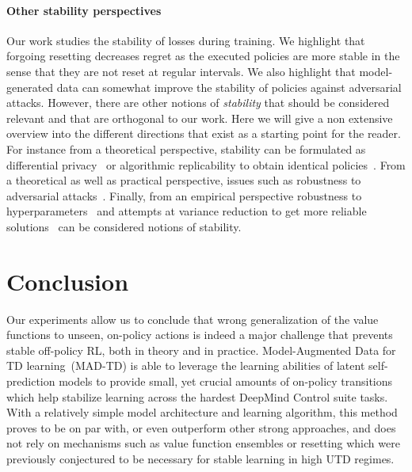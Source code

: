\paragraph{Other stability perspectives} Our work studies the stability of losses during training.
We highlight that forgoing resetting decreases regret as the executed policies are more stable in the sense that they are not reset at regular intervals.
We also highlight that model-generated data can somewhat improve the stability of policies against adversarial attacks.
However, there are other notions of \emph{stability} that should be considered relevant and that are orthogonal to our work. 
Here we will give a non extensive overview into the different directions that exist as a starting point for the reader. For instance from a theoretical perspective, stability can be formulated as differential privacy~\textcite{vietri2020private} or algorithmic replicability to obtain identical policies~\textcite{eaton2023replicable}. From a theoretical as well as practical perspective, issues such as robustness to adversarial attacks~\textcite{nilim2005robust, iyengar2005robust, wiesemann2013robust, pinto2017robust}. Finally, from an empirical perspective robustness to hyperparameters~\textcite{ceron2024consistency, patterson2024cross} and attempts at variance reduction to get more reliable solutions~\textcite{anschel2017averaged, kuang2023variance} can be considered notions of stability.




\section{Conclusion}

Our experiments allow us to conclude that wrong generalization of the value functions to unseen, on-policy actions is indeed a major challenge that prevents stable off-policy RL, both in theory and in practice.
Model-Augmented Data for TD learning~(MAD-TD) is able to leverage the learning abilities of latent self-prediction models to provide small, yet crucial amounts of on-policy transitions which help stabilize learning across the hardest DeepMind Control suite tasks.
With a relatively simple model architecture and learning algorithm, this method proves to be on par with, or even outperform other strong approaches, and does not rely on mechanisms such as value function ensembles or resetting which were previously conjectured to be necessary for stable learning in high UTD regimes.

